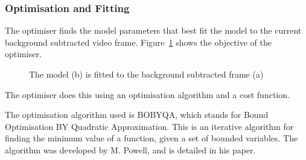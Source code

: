 \subsubsection{Optimisation and Fitting}

The optimiser finds the model parameters that best fit the model to the current background subtracted video frame. Figure~\ref{fig:modelfit} shows the objective of the optimiser.

\begin{figure}[H]
    \centering
\caption{The model (b) is fitted to the background subtracted frame (a)}
\label{fig:modelfit}
\end{figure}

The optimiser does this using an optimisation algorithm and a cost function.

The optimisation algorithm used is BOBYQA, which stands for Bound Optimisation BY Quadratic Approximation. This is an iterative algorithm for finding the minimum value of a function, given a set of bounded variables. The algorithm was developed by M. Powell, and is detailed in his paper\cite{bobyqa}.


